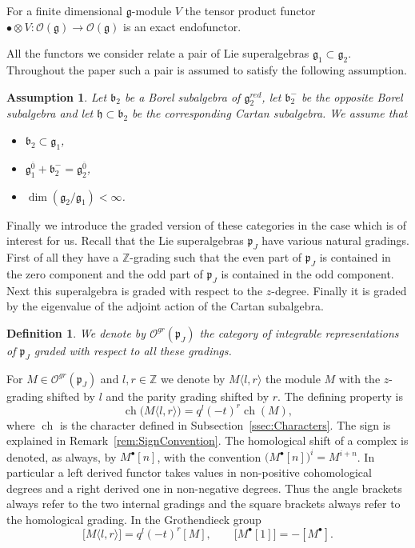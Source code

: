 \documentclass[10pt]{amsart}
\newcommand{\sh}[2]{\langle #1,#2\rangle}
\newtheorem{definition}[theorem]{Definition}
\newtheorem{assumption}[theorem]{Assumption}
\newcommand{\fg}{{\mathfrak g}}
\newcommand{\fb}{{\mathfrak b}}
\newcommand{\fp}{{\mathfrak p}}
\newcommand{\fh}{{\mathfrak h}}
\DeclareMathOperator{\ch}{ch}
\begin{document}
	For a finite dimensional $\fg$-module $V$ the tensor product functor $\bullet \otimes V:\mathcal{O}(\fg) \rightarrow \mathcal{O}(\fg)$ is an exact endofunctor. 
	
	All the functors we consider relate a pair of Lie superalgebras $\fg_1 \subset \fg_2$. Throughout the paper such a pair is assumed to satisfy the following assumption.
	
	\begin{assumption}\label{ass}
		Let $\fb_2$ be a Borel subalgebra of $\fg_2^{red}$, let $\fb_2^-$ be the opposite Borel subalgebra and let $\fh \subset \fb_2$ be the corresponding Cartan subalgebra. We assume that 
		\begin{itemize}
			\item $\fb_2 \subset \fg_1$,
			\item $\fg_{1}^{\overline 0}+ \fb_2^-=\fg_{2}^{ \overline 0}$,
            \item $\dim(\fg_2/\fg_1) < \infty$.
		\end{itemize} 
	\end{assumption}
	
	Finally we introduce the graded version of these categories in the case which is of interest for us. Recall that the Lie superalgebras $\fp_J$ have various natural gradings. First of all they have a $\mathbb{Z}$-grading such that the even part of $\fp_J$ is contained in the zero component and the odd part of $\fp_J$ is contained in the odd component. Next this superalgebra is graded with respect to the $z$-degree. Finally it is graded by the eigenvalue of the adjoint action of the Cartan subalgebra.
	
	\begin{definition}\label{def:GradedCategory}
		We denote by $\mathcal{O}^{gr}(\fp_J)$ the category of integrable representations of $\fp_J$ graded with respect to all these gradings.
	\end{definition}
	
	For $M \in \mathcal{O}^{gr}(\fp_J)$ and $l,r \in \mathbb{Z}$ we denote by $M\sh{l}{r}$ the module $M$ with the $z$-grading shifted by $l$ and the parity grading shifted by $r$. The defining property is
	\begin{equation}\label{eq:ShiftDefinition}
		\ch\bigl(M\sh{l}{r}\bigr)=q^l(-t)^r\ch(M),
	\end{equation}
	where $\ch$ is the character defined in Subsection~\ref{ssec:Characters}. The sign is explained in Remark~\ref{rem:SignConvention}.
	The homological shift of a complex is denoted, as always, by $M^\bullet[n]$, with the convention $\bigl(M^\bullet[n]\bigr)^i=M^{i+n}$. In particular a left derived functor takes values in non-positive cohomological degrees and a right derived one in non-negative degrees. Thus the angle brackets always refer to the two internal gradings and the square brackets always refer to the homological grading. In the Grothendieck group
	\[\bigl[M\sh{l}{r}\bigr]=q^l(-t)^r[M],\qquad \bigl[M^\bullet[1]\bigr]=-[M^\bullet].\]
	
\end{document}

